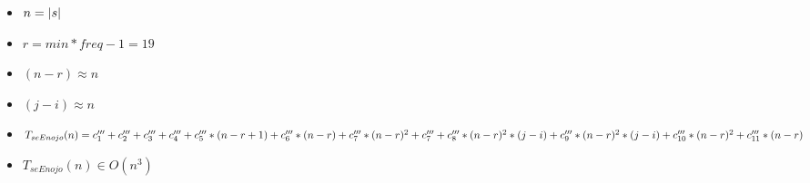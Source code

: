 \documentclass{article}
\begin{document}
    \begin{itemize}
        \item $n = |s|$
        \item $r = min * freq - 1 = 19$
        \item $(n-r) \approx{n}$
        \item $(j-i) \approx{n}$
        \item $T_{seEnojo}(n) = c^{\prime\prime\prime}_1 +
                                c^{\prime\prime\prime}_2 +
                                c^{\prime\prime\prime}_3 +
                                c^{\prime\prime\prime}_4 +
                                c^{\prime\prime\prime}_5 * (n-r+1) +
                                c^{\prime\prime\prime}_6 * (n-r) +
                                c^{\prime\prime\prime}_7 * (n-r)^{2} +
                                c^{\prime\prime\prime}_7 +
                                c^{\prime\prime\prime}_8 * (n-r)^{2} * (j-i) + \\
                                c^{\prime\prime\prime}_9 * (n-r)^{2} * (j-i) +
                                c^{\prime\prime\prime}_{10} * (n-r)^{2} +
                                c^{\prime\prime\prime}_{11} * (n-r)$
        \item $T_{seEnojo}(n) \in O(n^{3})$
    \end{itemize}
\end{document}
